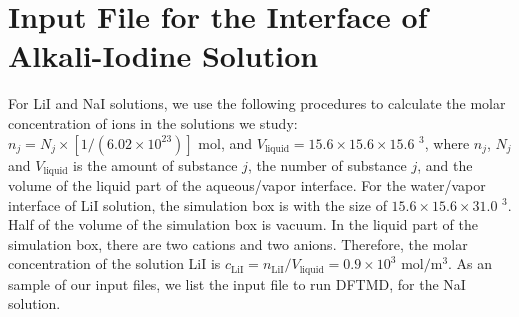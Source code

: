 \section{Input File for the Interface of Alkali-Iodine Solution}
For LiI and NaI solutions, we use the following procedures to calculate the molar concentration of ions in the solutions we study:
$n_j=N_j\times[1/(6.02\times10^{23})] {\text{ mol}}$, and
$V_{\text{liquid}}=15.6\times15.6\times15.6$ \A$^3$, 
where $n_j$, $N_j$ and $V_{\text{liquid}}$ is the amount of substance $j$, the number of substance $j$, and the 
volume of the liquid part of the aqueous/vapor interface.  
For the water/vapor interface of LiI solution, 
the simulation box is with the size of $15.6 \times 15.6 \times  31.0$ \A$^3$. 
Half of the volume of the simulation box is vacuum. 
In the liquid part of the simulation box, there are two \Li cations and two \I anions.
Therefore, the molar concentration of the solution LiI is $c_{\text{LiI}}={n_{\text{LiI}}}/{V_\text{liquid}}=0.9\times10^3  \text{ mol}/\text{m}^3$.
As an sample of our input files, we list the input file to run DFTMD, for the NaI solution. 
